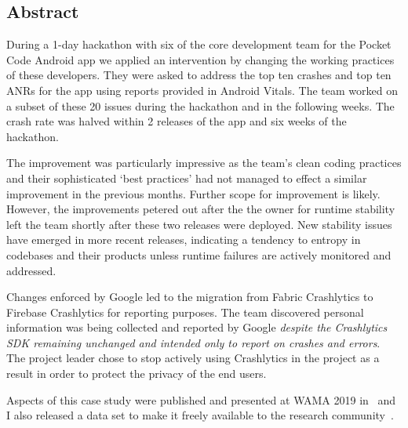 \subsection*{Abstract}
During a 1-day hackathon with six of the core development team for the Pocket Code Android app we applied an intervention by changing the working practices of these developers. They were asked to address the top ten crashes and top ten ANRs for the app using reports provided in Android Vitals.  The team worked on a subset of these 20 issues during the hackathon and in the following weeks. The crash rate was halved within 2 releases of the app and six weeks of the hackathon. 


The improvement was particularly impressive as the team's clean coding practices and their sophisticated `best practices' had not managed to effect a similar improvement in the previous months. Further scope for improvement is likely. However, the improvements petered out after the the owner for runtime stability left the team shortly after these two releases were deployed. New stability issues have emerged in more recent releases, indicating a tendency to entropy in codebases and their products unless runtime failures are actively monitored and addressed.

Changes enforced by Google led to the migration from Fabric Crashlytics to Firebase Crashlytics for reporting purposes. The team discovered personal information was being collected and reported by Google \textit{despite the Crashlytics SDK remaining unchanged and intended only to report on crashes and errors}. The project leader chose to stop actively using Crashlytics in the project as a result in order to protect the privacy of the end users.

Aspects of this case study were published and presented at WAMA 2019 in~\citep{harty_better_android_apps_using_android_vitals} and I also released a data set to make it freely available to the research community~\citep{harty_wama_dataset_examples}. 
 


